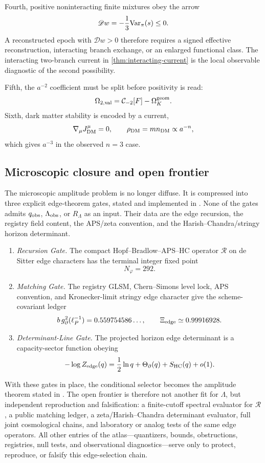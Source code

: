 \documentclass[aps,prd,reprint,nofootinbib,superscriptaddress,floatfix]{revtex4-2}
\numberwithin{equation}{section}
\theoremstyle{definition}
\theoremstyle{plain}
\newcommand{\Dil}{\mathscr D}
\begin{document}
Fourth, positive noninteracting finite mixtures obey the arrow
\[
\Dil w=-\frac13{\rm Var}_\pi(s)\le0.
\]
A reconstructed epoch with \(\Dil w>0\) therefore requires a signed
effective reconstruction, interacting branch exchange, or an enlarged
functional class.  The interacting two-branch current in
\cref{thm:interacting-current} is the local observable diagnostic of the
second possibility.

Fifth, the \(a^{-2}\) coefficient must be split before positivity is read:
\[
\Omega_{2,{\rm val}}=\mathcal C_{-2}[F]-\Omega_K^{\rm geom}.
\]
Sixth, dark matter stability is encoded by a current,
\[
\nabla_\mu J^\mu_{\rm DM}=0,\qquad
\rho_{\rm DM}=m n_{\rm DM}\propto a^{-n},
\]
which gives \(a^{-3}\) in the observed \(n=3\) case.



\subsection{Microscopic closure and open frontier}

The microscopic amplitude problem is no longer diffuse.  It is compressed into
three explicit edge-theorem gates, stated and implemented in
.  None of the gates admits \(q_{\rm obs}\),
\(\Lambda_{\rm obs}\), or \(R_\Lambda\) as an input.  Their data are the edge
recursion, the registry field content, the APS/zeta convention, and the
Harish--Chandra/stringy horizon determinant.

\begin{enumerate}
\item \emph{Recursion Gate.}
The compact Hopf--Bradlow--APS--HC operator \(\mathcal R\) on de Sitter edge
characters has the terminal integer fixed point
\[
N_\varphi=292.
\]

\item \emph{Matching Gate.}
The registry GLSM, Chern--Simons level lock, APS convention, and
Kronecker-limit stringy edge character give the scheme-covariant ledger
\[
b\,g_\partial^2(\ell_P^{-1})
=
0.559754586\ldots,
\qquad
\Xi_{\rm edge}\simeq0.99916928 .
\]

\item \emph{Determinant-Line Gate.}
The projected horizon edge determinant is a capacity-sector function obeying
\[
-\log Z_{\rm edge}(q)
=
\frac12\ln q+\Theta_\partial(q)+S_{\rm HC}(q)+o(1).
\]
\end{enumerate}

With these gates in place, the conditional selector becomes the amplitude
theorem stated in .  The open frontier is
therefore not another fit for \(\Lambda\), but independent reproduction and
falsification: a finite-cutoff spectral evaluator for \(\mathcal R\), a public
matching ledger, a zeta/Harish--Chandra determinant evaluator, full joint
cosmological chains, and laboratory or analog tests of the same edge
operators.  All other entries of the atlas---quantizers, bounds,
obstructions, registries, null tests, and observational diagnostics---serve
only to protect, reproduce, or falsify this edge-selection chain.
\end{document}
